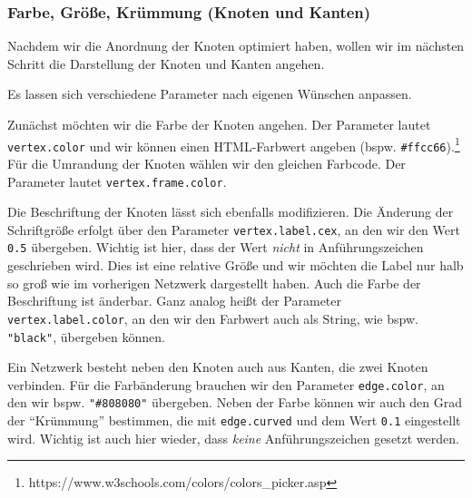 \documentclass[11pt]{article}
\begin{document}
    \hypertarget{farbe-gruxf6uxdfe-kruxfcmmung-knoten-und-kanten}{%
\subsubsection{Farbe, Größe, Krümmung (Knoten und
Kanten)}\label{farbe-gruxf6uxdfe-kruxfcmmung-knoten-und-kanten}}

Nachdem wir die Anordnung der Knoten optimiert haben, wollen wir im
nächsten Schritt die Darstellung der Knoten und Kanten angehen.

Es lassen sich verschiedene Parameter nach eigenen Wünschen anpassen.

Zunächst möchten wir die Farbe der Knoten angehen. Der Parameter lautet
\texttt{vertex.color} und wir können einen HTML-Farbwert angeben (bspw.
\texttt{\#ffcc66}).\footnote{https://www.w3schools.com/colors/colors\_picker.asp}
Für die Umrandung der Knoten wählen wir den gleichen Farbcode. Der
Parameter lautet \texttt{vertex.frame.color}.

Die Beschriftung der Knoten lässt sich ebenfalls modifizieren. Die
Änderung der Schriftgröße erfolgt über den Parameter
\texttt{vertex.label.cex}, an den wir den Wert \texttt{0.5} übergeben.
Wichtig ist hier, dass der Wert \emph{nicht} in Anführungszeichen
geschrieben wird. Dies ist eine relative Größe und wir möchten die Label
nur halb so groß wie im vorherigen Netzwerk dargestellt haben. Auch die
Farbe der Beschriftung ist änderbar. Ganz analog heißt der Parameter
\texttt{vertex.label.color}, an den wir den Farbwert auch als String,
wie bspw. \texttt{"black"}, übergeben können.

Ein Netzwerk besteht neben den Knoten auch aus Kanten, die zwei Knoten
verbinden. Für die Farbänderung brauchen wir den Parameter
\texttt{edge.color}, an den wir bspw. \texttt{"\#808080"} übergeben.
Neben der Farbe können wir auch den Grad der ``Krümmung'' bestimmen, die
mit \texttt{edge.curved} und dem Wert \texttt{0.1} eingestellt wird.
Wichtig ist auch hier wieder, dass \emph{keine} Anführungszeichen
gesetzt werden.
\end{document}
